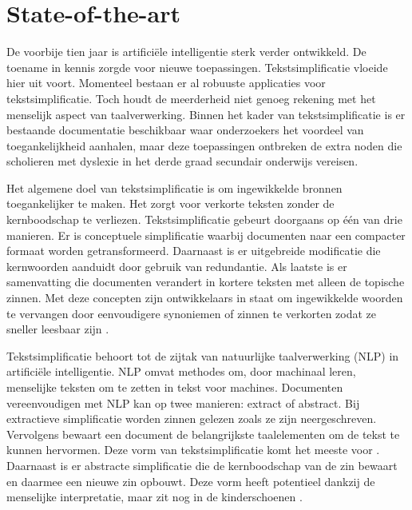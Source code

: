 
\section{State-of-the-art}%
\label{sec:state-of-the-art}

De voorbije tien jaar is artificiële intelligentie sterk verder ontwikkeld. De toename in kennis zorgde voor nieuwe toepassingen. Tekstsimplificatie vloeide hier uit voort. Momenteel bestaan er al robuuste applicaties voor tekstsimplificatie. Toch houdt de meerderheid niet genoeg rekening met het menselijk aspect van taalverwerking. Binnen het kader van tekstsimplificatie is er bestaande documentatie beschikbaar waar onderzoekers het voordeel van toegankelijkheid aanhalen, maar deze toepassingen ontbreken de extra noden die scholieren met dyslexie in het derde graad secundair onderwijs vereisen.

Het algemene doel van tekstsimplificatie is om ingewikkelde bronnen toegankelijker te maken. Het zorgt voor verkorte teksten zonder de kernboodschap te verliezen. Tekstsimplificatie gebeurt doorgaans op één van drie manieren. Er is conceptuele simplificatie waarbij documenten naar een compacter formaat worden getransformeerd. Daarnaast is er uitgebreide modificatie die kernwoorden aanduidt door gebruik van redundantie. Als laatste is er samenvatting die documenten verandert in kortere teksten met alleen de topische zinnen. Met deze concepten zijn ontwikkelaars in staat om ingewikkelde woorden te vervangen door eenvoudigere synoniemen of zinnen te verkorten zodat ze sneller leesbaar zijn \autocite{Siddharthan2014}.

Tekstsimplificatie behoort tot de zijtak van natuurlijke taalverwerking (NLP) in artificiële intelligentie. NLP omvat methodes om, door machinaal leren, menselijke teksten om te zetten in tekst voor machines. Documenten vereenvoudigen met NLP kan op twee manieren: extract of abstract. Bij extractieve simplificatie worden zinnen gelezen zoals ze zijn neergeschreven. Vervolgens bewaart een document de belangrijkste taalelementen om de tekst te kunnen hervormen. Deze vorm van tekstsimplificatie komt het meeste voor \autocite{Sciforce2020}. Daarnaast is er abstracte simplificatie die de kernboodschap van de zin bewaart en daarmee een nieuwe zin opbouwt. Deze vorm heeft potentieel dankzij de menselijke interpretatie, maar zit nog in de kinderschoenen \autocite{Chowdhary2020}.

